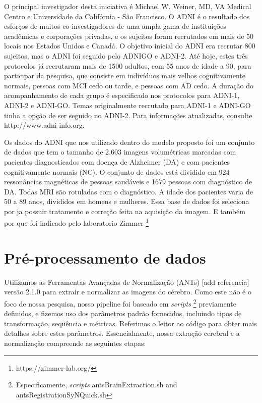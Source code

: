\documentclass[openright]{UFRGS} %
\begin{document}
O principal investigador desta iniciativa é Michael W. Weiner, MD, VA Medical
Centro e Universidade da Califórnia - São Francisco. O ADNI é o resultado dos esforços de muitos
co-investigadores de uma ampla gama de instituições acadêmicas e corporações privadas,
e os sujeitos foram recrutados em mais de 50 locais nos Estados Unidos e Canadá. O objetivo inicial do ADNI era recrutar 800 sujeitos, mas o ADNI foi seguido pelo ADNIGO e ADNI-2.
 Até hoje, estes três protocolos já recrutaram mais de 1500 adultos, com 55 anos de idade
a 90, para participar da pesquisa, que consiste em indivíduos mais velhos cognitivamente normais,
pessoas com MCI cedo ou tarde, e pessoas com AD cedo. A duração do acompanhamento de
cada grupo é especificado nos protocolos para ADNI-1, ADNI-2 e ADNI-GO. Temas
originalmente recrutado para ADNI-1 e ADNI-GO tinha a opção de ser seguido no ADNI-2.
Para informações atualizadas, consulte http://www.adni-info.org.

Os dados do ADNI que nos utilizado dentro do modelo proposto foi
um conjunto de dados que tem o tamanho de 2.603 imagens volumétricas marcadas com pacientes diagnosticados com doença de Alzheimer (DA) e com pacientes cognitivamente normais (NC). O conjunto de dados está dividido em 924 ressonâncias magnéticas de pessoas saudáveis e 1679 pessoas com diagnóstico de DA. Todas MRI são rotuladas com o diagnóstico. A idade dos pacientes varia de 50 a 89 anos, divididos em homens e mulheres. Essa base de dados foi seleciona por ja possuir tratamento e correção  feita na aquisição da imagem. E também por que foi indicado pelo 
laboratorio  Zimmer \footnote[1]{https://zimmer-lab.org/} 






\section{Pré-processamento de dados}
Utilizamos as Ferramentas Avançadas de Normalização (ANTs) [add referencia] versão 2.1.0 para extrair e normalizar as imagens do cérebro. Como este não é o foco de nossa pesquisa, nosso pipeline foi baseado em \textit{scripts} \footnote[1]{Especificamente,  \textit{scripts} antsBrainExtraction.sh and antsRegistrationSyNQuick.sh}
 previamente definidos, e fizemos uso dos parâmetros padrão fornecidos,
incluindo tipos de transformação, seqüência e métricas. Referimos o leitor ao código
para obter mais detalhes sobre estes parâmetros. Essencialmente, nossa extração cerebral e a normalização compreende as seguintes etapas:
\end{document}
